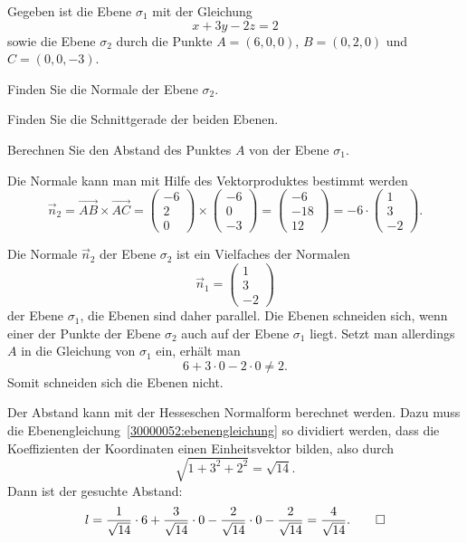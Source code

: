 Gegeben ist die Ebene $\sigma_1$ mit der Gleichung
\begin{equation}
x+3y-2z=2
\label{30000052:ebenengleichung}
\end{equation}
sowie die Ebene $\sigma_2$ durch die Punkte $A=(6,0,0)$, $B=(0,2,0)$ und
$C=(0,0,-3)$.
\begin{teilaufgaben}
\item
Finden Sie die Normale der Ebene $\sigma_2$.
\item 
Finden Sie die Schnittgerade der beiden Ebenen.
\item 
Berechnen Sie den Abstand des Punktes $A$ von der Ebene $\sigma_1$.
\end{teilaufgaben}

\begin{loesung}
\begin{teilaufgaben}
\item
Die Normale kann man mit Hilfe des Vektorproduktes bestimmt werden
\[
\vec{n}_2
=
\overrightarrow{AB}\times\overrightarrow{AC}
=
\begin{pmatrix}
-6\\
 2\\
 0
\end{pmatrix}
\times
\begin{pmatrix}
-6\\
 0\\
-3
\end{pmatrix}
=
\begin{pmatrix}
-6\\
-18\\
12
\end{pmatrix}
=
-6\cdot\begin{pmatrix}
1\\
3\\
-2
\end{pmatrix}.
\]
\item
Die Normale $\vec{n}_2$ der Ebene $\sigma_2$ ist ein Vielfaches der
Normalen
\[
\vec{n}_1=\begin{pmatrix}1\\3\\-2\end{pmatrix}
\]
der Ebene $\sigma_1$, die Ebenen sind daher parallel.
Die Ebenen schneiden sich, wenn einer der Punkte der Ebene $\sigma_2$ auch
auf der Ebene $\sigma_1$ liegt. 
Setzt man allerdings $A$ in die Gleichung von $\sigma_1$ ein, erhält man
\[
6+3\cdot 0-2\cdot 0 \ne 2.
\]
Somit schneiden sich die Ebenen nicht.
\item
Der Abstand kann mit der Hesseschen Normalform berechnet werden.
Dazu muss die Ebenengleichung~\eqref{30000052:ebenengleichung}
so dividiert werden, dass die Koeffizienten der Koordinaten einen
Einheitsvektor bilden, also durch
\[
\sqrt{1+3^2+2^2}=\sqrt{14}.
\]
Dann ist der gesuchte Abstand:
\[
l
=
\frac1{\sqrt{14}}\cdot 6
+\frac3{\sqrt{14}}\cdot 0
-\frac2{\sqrt{14}}\cdot 0
-\frac2{\sqrt{14}}
=
\frac4{\sqrt{14}}.
\qedhere
\]
\end{teilaufgaben}
\end{loesung}

